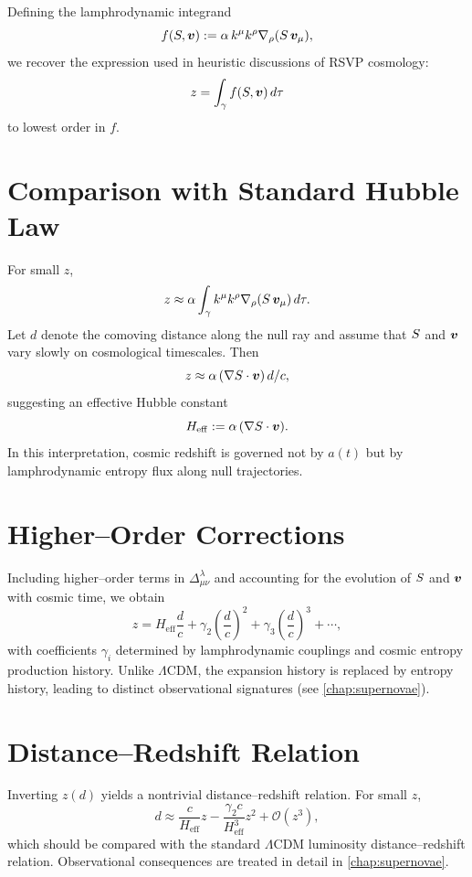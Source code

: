 Defining the lamphrodynamic integrand
\begin{equation}
\label{eq:f-definition}
  f(S,\bm{v})
  := \alpha\,k^\mu k^\rho \nabla_\rho(S\,\bm{v}_\mu),
\end{equation}
we recover the expression used in heuristic discussions of RSVP cosmology:
\[
  z = \int_\gamma f(S,\bm{v})\,d\tau
\]
to lowest order in $f$.

\section{Comparison with Standard Hubble Law}

For small $z$,
\[
  z
  \approx \alpha \int_\gamma k^\mu k^\rho
               \nabla_\rho(S\,\bm{v}_\mu)\,d\tau.
\]
Let $d$ denote the comoving distance along the null ray and assume that
$S$ and $\bm{v}$ vary slowly on cosmological timescales. Then
\[
  z \approx \alpha\,(\nabla S\cdot\bm{v})\,d/c,
\]
suggesting an effective Hubble constant
\[
  H_{\mathrm{eff}}
  := \alpha\,(\nabla S\cdot\bm{v}).
\]
In this interpretation, cosmic redshift is governed not by $a(t)$ but by
lamphrodynamic entropy flux along null trajectories.

\section{Higher–Order Corrections}

Including higher–order terms in $\Delta^\lambda_{\mu\nu}$ and accounting for
the evolution of $S$ and $\bm{v}$ with cosmic time, we obtain
\[
  z = H_{\mathrm{eff}}\frac{d}{c}
  + \gamma_2 \left(\frac{d}{c}\right)^2
  + \gamma_3 \left(\frac{d}{c}\right)^3 + \cdots,
\]
with coefficients $\gamma_i$ determined by lamphrodynamic couplings and
cosmic entropy production history. Unlike $\Lambda$CDM, the expansion
history is replaced by entropy history, leading to distinct observational
signatures (see \cref{chap:supernovae}).

\section{Distance–Redshift Relation}

Inverting $z(d)$ yields a nontrivial distance–redshift relation. For
small $z$,
\[
  d \approx \frac{c}{H_{\mathrm{eff}}} z
    - \frac{\gamma_2 c}{H_{\mathrm{eff}}^3} z^2
    + \mathcal{O}(z^3),
\]
which should be compared with the standard $\Lambda$CDM luminosity
distance–redshift relation. Observational consequences are treated in
detail in \cref{chap:supernovae}.

